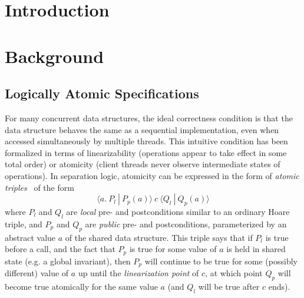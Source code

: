 \documentclass[runningheads]{llncs}
\newcommand{\wm}[1]{\textbf{\textcolor{blue}{[ WM: #1]}}}
\newcommand{\LB}[1]{\textbf{\textcolor{red}{[ LB: #1]}}}
\begin{document}
\section{Introduction}


\section{Background}
\label{background}

\subsection{Logically Atomic Specifications}
\label{atomic-triples}

For many concurrent data structures, the ideal correctness condition is that the data structure behaves the same as a sequential implementation, even when accessed simultaneously by multiple threads. This intuitive condition has been formalized in terms of linearizability (operations appear to take effect in some total order) or atomicity (client threads never observe intermediate states of operations). In separation logic, atomicity can be expressed in the form of \emph{atomic triples}~\cite{tada} of the form \[\langle a.\ P_l\ |\ P_p(a)\rangle\ c\ \langle Q_l\ |\ Q_p(a)\rangle\] where $P_l$ and $Q_l$ are \emph{local} pre- and postconditions similar to an ordinary Hoare triple, and $P_p$ and $Q_p$ are \emph{public} pre- and postconditions, parameterized by an abstract value $a$ of the shared data structure. This triple says that if $P_l$ is true before a call, and the fact that $P_p$ is true for some value of $a$ is held in shared state (e.g. a global invariant), then $P_p$ will continue to be true for some (possibly different) value of $a$ up until the \emph{linearization point} of $c$, at which point $Q_p$ will become true atomically for the same value $a$ (and $Q_l$ will be true after $c$ ends). %
\end{document}
